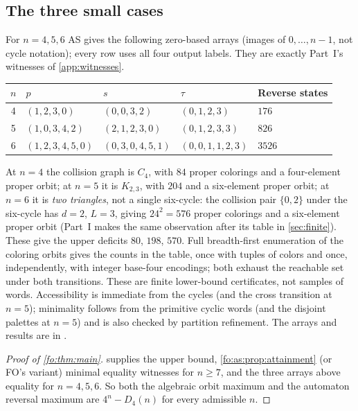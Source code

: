 \documentclass[11pt,a4paper]{article}
\numberwithin{equation}{section}
\theoremstyle{definition}
\theoremstyle{remark}
\begin{document}
\subsection{The three small cases}

For $n=4,5,6$ AS gives the following zero-based arrays (images of
$0,\ldots,n-1$, not cycle notation); every row uses all four output labels.
They are exactly Part~I's witnesses of \cref{app:witnesses}.
\begin{center}
\small
\begin{tabular}{@{}cllll@{}}
\toprule
$n$ & $p$ & $s$ & $\tau$ & Reverse states\\
\midrule
4 & $(1,2,3,0)$ & $(0,0,3,2)$ & $(0,1,2,3)$ & $176$\\
5 & $(1,0,3,4,2)$ & $(2,1,2,3,0)$ & $(0,1,2,3,3)$ & $826$\\
6 & $(1,2,3,4,5,0)$ & $(0,3,0,4,5,1)$ & $(0,0,1,1,2,3)$ & $3526$\\
\bottomrule
\end{tabular}
\end{center}
At $n=4$ the collision graph is $C_4$, with $84$ proper colorings and a
four-element proper orbit; at $n=5$ it is $K_{2,3}$, with $204$ and a
six-element proper orbit; at $n=6$ it is \emph{two triangles}, not a single
six-cycle: the collision pair $\{0,2\}$ under the six-cycle has $d=2$,
$L=3$, giving $24^2=576$ proper colorings and a six-element proper orbit
(Part~I makes the same observation after its table in \cref{sec:finite}).
These give the upper deficits $80$, $198$, $570$. Full breadth-first
enumeration of the coloring orbits gives the counts in the table, once with
tuples of colors and once, independently, with integer base-four encodings;
both exhaust the reachable set under both transitions. These are finite
lower-bound certificates, not samples of words. Accessibility is immediate
from the cycles (and the cross transition at $n=5$); minimality follows from
the primitive cyclic words (and the disjoint palettes at $n=5$) and is also
checked by partition refinement. The arrays and results are in
.

\begin{proof}[Proof of \cref{fo:thm:main}]
 supplies the upper bound, \cref{fo:as:prop:attainment}
(or FO's variant) minimal equality witnesses for $n\ge7$, and the three
arrays above equality for $n=4,5,6$. So both the algebraic orbit maximum and
the automaton reversal maximum are $4^n-D_4(n)$ for every admissible $n$.
\end{proof}
\end{document}
